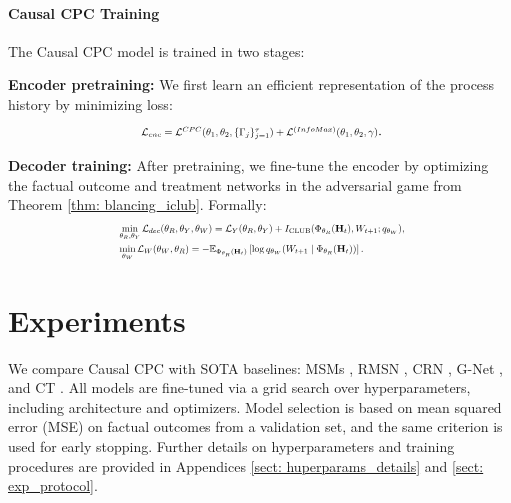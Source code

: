 \documentclass{article}
\theoremstyle{plain}
\theoremstyle{definition}
\theoremstyle{remark}
\begin{document}
\paragraph{Causal CPC Training} The Causal CPC model is trained in two stages:
\begin{inparaenum}[(1)]
    \item \textbf{Encoder pretraining:} We first learn an efficient representation of the process history by minimizing loss:
    \begin{equation*}
    \resizebox{0.5\textwidth}{!}{
    $\mathcal{L}_{enc} = \mathcal{L}^{CPC}(\theta_{1}, \theta_{2}, \{\Gamma_j\}_{j=1}^{\tau}) + \mathcal{L}^{(InfoMax)}(\theta_{1}, \theta_{2}, \gamma)$}.
    \end{equation*}
    \item \textbf{Decoder training:} After pretraining, we fine-tune the encoder by optimizing the factual outcome and treatment networks in the adversarial game from Theorem \ref{thm: blancing_iclub}. Formally:
    \begin{equation*}
    \resizebox{0.6\textwidth}{!}{
    $\begin{aligned}
    & \min_{\theta_{R}, \theta_{Y}} \mathcal{L}_{dec}(\theta_{R}, \theta_{Y}, \theta_{W}) = \mathcal{L}_Y(\theta_{R}, \theta_{Y}) + I_{\text{CLUB}}(\Phi_{\theta_{R}}(\mathbf{H}_t), W_{t+1}; q_{\theta_{W}}), \\
    & \min_{\theta_{W}} \mathcal{L}_{W}(\theta_{W}, \theta_{R}) = -\mathbb{E}_{\Phi_{\theta_{R}}(\mathbf{H}_t)} \left[ \log q_{\theta_{W}}(W_{t+1} \mid \Phi_{\theta_{R}}(\mathbf{H}_t)) \right].
    \end{aligned}
    $}
    \end{equation*}
\end{inparaenum}

\section{Experiments}
\label{sect: experiments}
We compare Causal CPC with SOTA baselines: MSMs \cite{robins2000MSM}, RMSN \cite{lim2018RMSM}, CRN \cite{bica2020estimatingCRN}, G-Net \cite{Li2021GNetAR}, and CT \cite{Melnychuk2022CausalTF}. All models are fine-tuned via a grid search over hyperparameters, including architecture and optimizers. Model selection is based on mean squared error (MSE) on factual outcomes from a validation set, and the same criterion is used for early stopping. Further details on hyperparameters and training procedures are provided in Appendices \ref{sect: huperparams_details} and \ref{sect: exp_protocol}.
\end{document}

